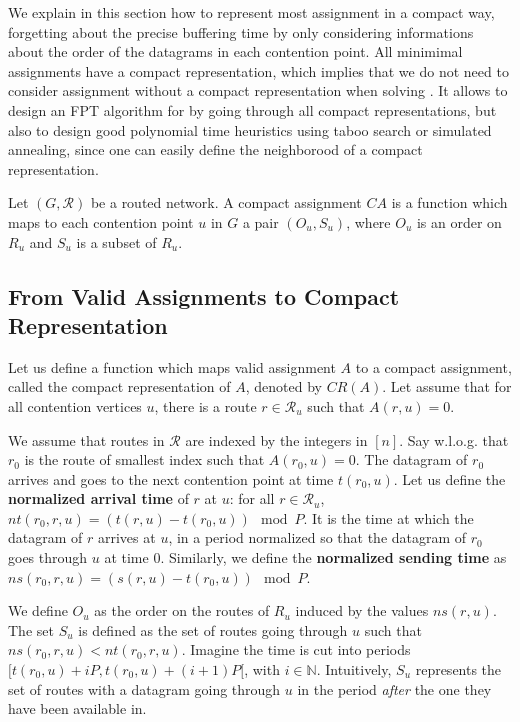 \documentclass[english]{article}
\begin{document}
We explain in this section how to represent most assignment in a compact way, forgetting about the precise buffering time by only considering informations about the order of the datagrams in each contention point. All minimimal assignments have a compact representation, which implies that we do not need to consider assignment without a compact representation when solving \spall. 
It allows to design an FPT algorithm for \spall by going through all compact representations, but also to design good polynomial time heuristics using taboo search or simulated annealing, since one can easily define the neighborood of a compact representation.


\begin{definition}
Let $(G, \mathcal{R})$ be a routed network. A compact assignment $CA$ is a function which maps to each contention point $u$ in $G$ a pair $(O_u,S_u)$, where $O_u$ is an order on $R_u$ and $S_u$ is a subset of $R_u$.
\label{definition:compact}
\end{definition}


\subsection{From Valid Assignments to Compact Representation}

Let us define a function which maps valid assignment $A$ to a compact assignment, called the compact representation of $A$, denoted by $CR(A)$. Let assume that for all contention vertices $u$, there is a route $r \in \mathcal{R}_u$ such that $A(r,u) = 0$.

We assume that routes in $\mathcal{R}$ are indexed by the integers in $[n]$. Say w.l.o.g. that $r_0$ is the route of smallest index such that $A(r_0,u) = 0$. The datagram of $r_0$ arrives and goes to the next contention point at time $t(r_0,u)$. Let us define the \textbf{normalized arrival time} of $r$ at $u$: for all $r \in \mathcal{R}_u$, $nt(r_0,r,u) = (t(r,u) - t(r_0,u)) \mod P$. It is the time at which the datagram of $r$ arrives at $u$, in a period normalized so that the datagram of $r_0$ goes through $u$ at time $0$. Similarly, we define the \textbf{normalized sending time} as $ns(r_0,r,u) = (s(r,u) - t(r_0,u)) \mod P$.

We define $O_u$ as the order on the routes of $R_u$ induced by the values $ns(r,u)$. The set $S_u$ is defined as the set of routes going through $u$ such that $ns(r_0,r,u) < nt(r_0,r,u)$. Imagine the time is cut into periods $[t(r_0,u) + iP,t(r_0,u) + (i+1)P [$, with $i \in \mathbb{N}$. Intuitively, $S_u$ represents the set of routes with a datagram going through $u$ in the period \emph{after} the one they have been available in. 
\end{document}
